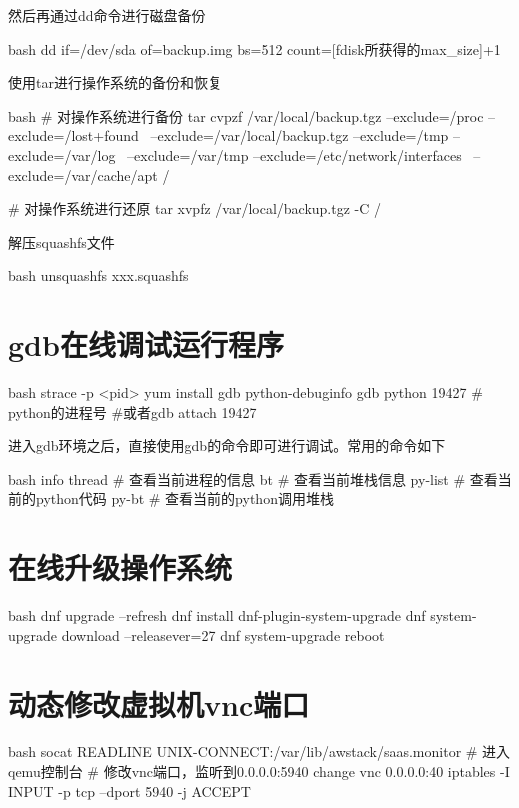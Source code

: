\begin{outline}[enumerate]
然后再通过dd命令进行磁盘备份
\begin{code-in-enumerate}{bash}
dd if=/dev/sda of=backup.img bs=512 count=[fdisk所获得的max_size]+1
\end{code-in-enumerate}

\1 使用tar进行操作系统的备份和恢复
\begin{code-in-enumerate}{bash}
# 对操作系统进行备份
tar cvpzf /var/local/backup.tgz --exclude=/proc --exclude=/lost+found \
    --exclude=/var/local/backup.tgz --exclude=/tmp --exclude=/var/log \
    --exclude=/var/tmp --exclude=/etc/network/interfaces \
    --exclude=/var/cache/apt /

# 对操作系统进行还原
tar xvpfz /var/local/backup.tgz -C /
\end{code-in-enumerate}

\1 解压squashfs文件
\begin{code-in-enumerate}{bash}
unsquashfs xxx.squashfs
\end{code-in-enumerate}

\end{outline}

\section{gdb在线调试运行程序}
\begin{code-block}{bash}
strace -p <pid>
yum install gdb python-debuginfo
gdb python 19427 # python的进程号
#或者gdb attach 19427
\end{code-block}

进入gdb环境之后，直接使用gdb的命令即可进行调试。常用的命令如下
\begin{code-block}{bash}
info thread # 查看当前进程的信息
bt          # 查看当前堆栈信息
py-list     # 查看当前的python代码
py-bt       # 查看当前的python调用堆栈
\end{code-block}

\section{在线升级操作系统}
\begin{code-block}{bash}
dnf upgrade --refresh
dnf install dnf-plugin-system-upgrade
dnf system-upgrade download --releasever=27
dnf system-upgrade reboot
\end{code-block}

\section{动态修改虚拟机vnc端口}
\begin{code-block}{bash}
socat READLINE UNIX-CONNECT:/var/lib/awstack/saas.monitor
# 进入qemu控制台
# 修改vnc端口，监听到0.0.0.0:5940
change vnc 0.0.0.0:40
iptables -I INPUT -p tcp --dport 5940 -j ACCEPT
\end{code-block}

